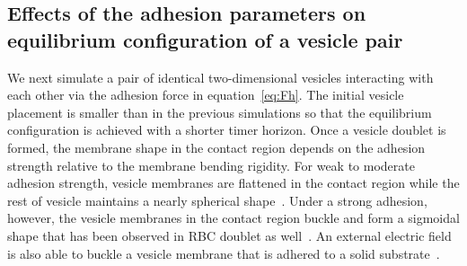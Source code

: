 \documentclass[prf,superscriptaddress,showpacs]{revtex4-1}
\begin{document}
\subsection{Effects of the adhesion parameters on equilibrium
configuration of a vesicle pair}
\label{subsec:qflow_adhesion_parameters} 
We next simulate a pair of identical two-dimensional vesicles
interacting with each other via the adhesion force in
equation~\eqref{eq:Fh}.  The initial vesicle placement is smaller than
in the previous simulations so that the equilibrium configuration is
achieved with a shorter timer horizon.  Once a vesicle doublet is
formed, the membrane shape in the contact region depends on the adhesion
strength relative to the membrane bending rigidity.  For weak to
moderate adhesion strength, vesicle membranes are flattened in the
contact region while the rest of vesicle maintains a nearly spherical
shape~\cite{EvansMetcalfe1984_BJ, Book_PhysicalBasisCellAdhesion,
Book_IntermolecularSurfaceForces,
RamachandranAndersonLealIsraelachvili2010_Langmuir}.  Under a strong
adhesion, however, the vesicle membranes in the contact region buckle
and form a sigmoidal shape  that has been observed in RBC doublet as
well~\cite{Ziherl2007_PRL, ZiherlSvetina2007_PNAS,
FlormannAouane2017_SciReports}.  An external electric field is also able
to buckle a vesicle membrane that is adhered to a solid
substrate~\cite{SteinkuhlerAgudo-Canalejo2016_BJ}.

\end{document}
